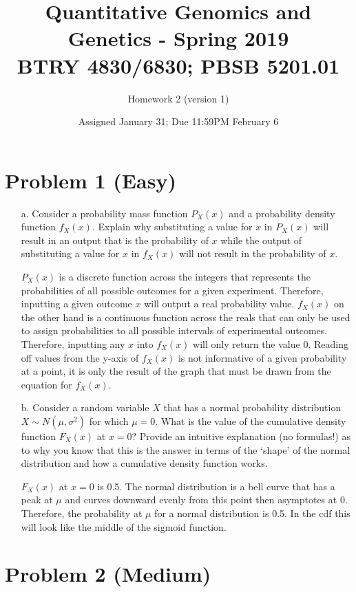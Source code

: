 \documentclass[letterpaper, 11pt]{article}
\title{Quantitative Genomics and Genetics - Spring 2019 \\
BTRY 4830/6830; PBSB 5201.01}
\author{Homework 2 (version 1)}
\date{Assigned January 31; Due 11:59PM February 6}                                           %
\begin{document}
\vspace{-20in}

\maketitle
\section*{Problem 1 (Easy)}

\begin{itemize}

\item[a.] Consider a probability mass function $P_{X}(x)$ and a probability density function $f_{X}(x)$.  Explain why substituting a value for $x$ in $P_{X}(x)$ will result in an output that is the probability of $x$ while the output of substituting a value for $x$ in $f_{X}(x)$ will not result in the probability of $x$.

$P_{X}(x)$ is a discrete function across the integers that represents the probabilities of all possible outcomes for a given experiment. Therefore, inputting a given outcome $x$ will output a real probability value. $f_{X}(x)$ on the other hand is a continuous function across the reals that can only be used to assign probabilities to all possible intervals of experimental outcomes. Therefore, inputting any $x$ into $f_{X}(x)$ will only return the value 0. Reading off values from the y-axis of $f_{X}(x)$ is not informative of a given probability at a point, it is only the result of the graph that must be drawn from the equation for $f_{X}(x)$.

\item[b.] Consider a random variable $X$ that has a normal probability distribution $X \sim N(\mu, \sigma^2)$ for which $\mu = 0$.  What is the value of the cumulative density function $F_{X}(x)$ at $x=0$?  Provide an intuitive explanation (no formulas!) as to why you know that this is the answer in terms of the `shape' of the normal distribution and how a cumulative density function works.

$F_{X}(x)$ at $x=0$ is 0.5. The normal distribution is a bell curve that has a peak at $\mu$ and curves downward evenly from this point then asymptotes at 0. Therefore, the probability at $\mu$ for a normal distribution is 0.5. In the cdf this will look like the middle of the sigmoid function.
\end{itemize}

\section*{Problem 2 (Medium)}
\end{document}

